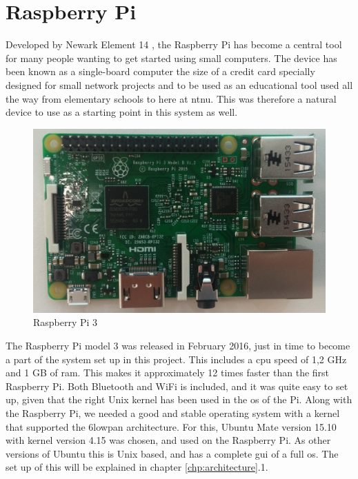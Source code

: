 
\section{Raspberry Pi}

Developed by Newark Element 14 \cite{newark}, the Raspberry Pi has become a central tool for many people wanting to get started using small computers. The device has been known as a single-board computer the size of a credit card specially designed for small network projects and to be used as an educational tool used all the way from elementary schools to here at \gls{ntnu}. This was therefore a natural device to use as a starting point in this system as well. 

\begin{figure}[ht]
    \centering
    \includegraphics[scale=0.35]{pi3.png}    
    \caption{Raspberry Pi 3}
    \label{fig:piPicture}
\end{figure}

The Raspberry Pi model 3 was released in February 2016, just in time to become a part of the system set up in this project. This includes a \gls{cpu} speed of 1,2 GHz and 1 GB of \gls{ram}. This makes it approximately 12 times faster than the first Raspberry Pi. Both Bluetooth and WiFi is included, and it was quite easy to set up, given that the right Unix kernel has been used in the \gls{os} of the Pi. Along with the Raspberry Pi, we needed a good and stable operating system with a kernel that supported the \gls{6lowpan} architecture. For this, Ubuntu Mate version 15.10 with kernel version 4.15 was chosen, and used on the Raspberry Pi. As other versions of Ubuntu this is Unix based, and has a complete \gls{gui} of a full \gls{os}. The set up of this will be explained in chapter \ref{chp:architecture}.1. 

